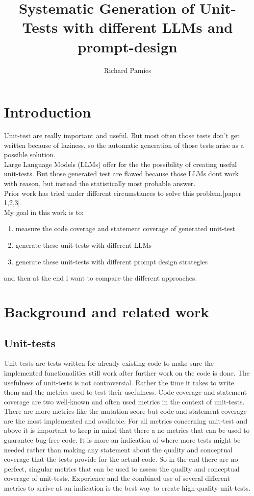 \documentclass[a4paper,11pt,oneside]{memoir}
\title{Systematic Generation of Unit-Tests with different LLMs and prompt-design}
\author{Richard Pamies}
\begin{document}
\frontmatter

\smarttitle

\newpage
\tableofcontents

\mainmatter

\chapter{Introduction}
Unit-test are really important and useful. But most often those tests don't get written because of laziness, so the automatic generation of those tests arise as a possible solution.
\\
Large Language Models (LLMs) offer for the the possibility of creating useful unit-tests. But those generated test are flawed because those LLMs dont work with reason, but instead the statistically most probable answer.
\\
Prior work  has tried under different circumstances to solve this problem.[paper 1,2,3].
\\
My goal in this work is to:\\
\begin{enumerate}
\item measure the code coverage and statement coverage of generated unit-test
\item generate these unit-tests with different LLMs
\item generate these unit-tests with different prompt design strategies
\end{enumerate}
and then at the end i want to compare the different approaches.

\chapter{Background and related work}
\section{Unit-tests}
Unit-tests are tests written for already existing code to make sure the implemented functionalities still work after further work on the code is done. The usefulness of unit-tests is not controversial. Rather the time it takes to write them and the metrics used to test their usefulness. 
Code coverage and statement coverage are two well-known and often used metrics in the context of unit-tests. There are more metrics like the mutation-score but code and statement coverage are the most implemented and available.
For all metrics concerning unit-test and above it is important to keep in mind that there a no metrics that can be used to guarantee bug-free code. It is more an indication of where more tests might be needed rather than making any statement about the quality and conceptual coverage that the tests provide for the actual code.
So in the end there are no perfect, singular metrics that can be used to assess the quality and conceptual coverage of unit-tests. Experience and the combined use of several different metrics to arrive at an indication is the best way to create high-quality unit-tests.
\end{document}
